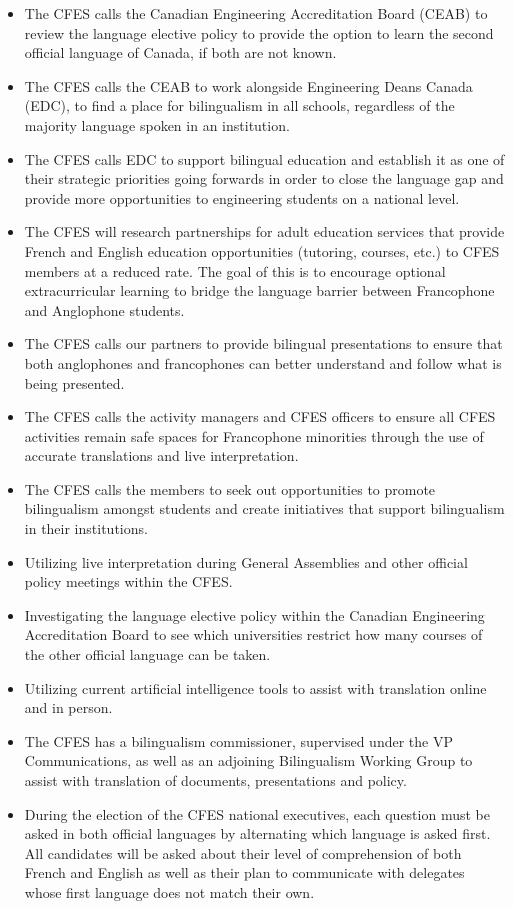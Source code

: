 \begin{itemize}
 \item The CFES calls the Canadian Engineering Accreditation Board (CEAB) to review the language elective policy to provide the option to learn the second official language of Canada, if both are not known.
 \item The CFES calls the CEAB to work alongside Engineering Deans Canada (EDC), to find a place for bilingualism in all schools, regardless of the majority language spoken in an institution.
 \item The CFES calls EDC to support bilingual education and establish it as one of their strategic priorities going forwards in order to close the language gap and provide more opportunities to engineering students on a national level.
 \item The CFES will research partnerships for adult education services that provide French and English education opportunities (tutoring, courses, etc.) to CFES members at a reduced rate. The goal of this is to encourage optional extracurricular learning to bridge the language barrier between Francophone and Anglophone students.
 \item The CFES calls our partners to provide bilingual presentations to ensure that both anglophones and francophones can better understand and follow what is being presented.
 \item The CFES calls the activity managers and CFES officers to ensure all CFES activities remain safe spaces for Francophone minorities through the use of accurate translations and live interpretation.
 \item The CFES calls the members to seek out opportunities to promote bilingualism amongst students and create initiatives that support bilingualism in their institutions.
\end{itemize}

\begin{itemize}
 \item Utilizing live interpretation during General Assemblies and other official policy meetings within the CFES.
 \item Investigating the language elective policy within the Canadian Engineering Accreditation Board to see which universities restrict how many courses of the other official language can be taken.
 \item Utilizing current artificial intelligence tools to assist with translation online and in person.
 \item The CFES has a bilingualism commissioner, supervised under the VP Communications, as well as an adjoining Bilingualism Working Group to assist with translation of documents, presentations and policy.
 \item During the election of the CFES national executives, each question must be asked in both official languages by alternating which language is asked first. All candidates will be asked about their level of comprehension of both French and English as well as their plan to communicate with delegates whose first language does not match their own.
\end{itemize}

